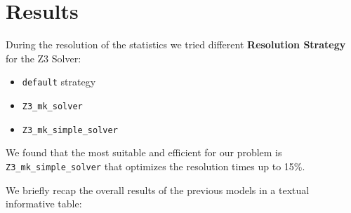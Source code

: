 \newpage
\section{Results}
During the resolution of the statistics we tried different \textbf{Resolution Strategy} for the Z3 Solver:
\begin{itemize}
	\item \texttt{default} strategy
	\item \texttt{Z3\_mk\_solver}
	\item \texttt{Z3\_mk\_simple\_solver}
\end{itemize}
We found that the most suitable and efficient for our problem is \texttt{Z3\_mk\_simple\_solver} that optimizes the resolution times up to 15\%.

We briefly recap the overall results of the previous models in a textual informative table:

